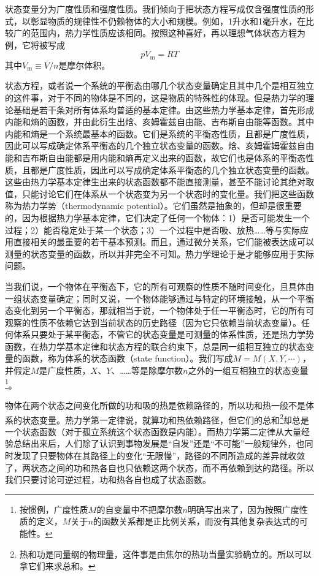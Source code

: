 \documentclass[main.tex]{subfiles}
\begin{document}
状态变量分为广度性质和强度性质。我们倾向于把状态方程写成仅含强度性质的形式，以彰显物质的规律性不仍赖物体的大小和规模。例如，1升水和1毫升水，在比较广的范围内，热力学性质应该相同。按照这种喜好，再以理想气体状态方程为例，它将被写成
\[pV_\text{m}=RT\]
其中$V_\text{m}\equiv V/n$是摩尔体积。

状态方程，或者说一个系统的平衡态由哪几个状态变量确定且其中几个是相互独立的这件事，对于不同的物体是不同的，这是物质的特殊性的体现。但是热力学的理论基础是若干条对所有体系均普适的基本定律。由这些热力学基本定律，首先形成内能和熵的函数，并由此衍生出焓、亥姆霍兹自由能、吉布斯自由能等函数。其中内能和熵是一个系统最基本的函数。它们是系统的平衡态性质，且都是广度性质，因此可以写成确定体系平衡态的几个独立状态变量的函数。焓、亥姆霍姆霍兹自由能和吉布斯自由能都是用内能和熵再定义出来的函数，故它们也是体系的平衡态性质，且都是广度性质，因此可以写成确定体系平衡态的几个独立状态变量的函数。这些由热力学基本定律生出来的状态函数都不能直接测量，甚至不能讨论其绝对取值，只能讨论它们在体系从一个状态变为另一个状态时的变化量。我们把这些函数称为热力学势（thermodynamic potential）。它们虽然是抽象的，但却是很重要的，因为根据热力学基本定律，它们决定了任何一个物体：1）是否可能发生一个过程；2）能否稳定处于某一个状态；3）一个过程中是否吸、放热……等与实际应用直接相关的最重要的若干基本预测。而且，通过微分关系，它们能被表达成可以测量的状态变量的函数，所以并非完全不可知。热力学理论于是才能够应用于实际问题。

当我们说，一个物体在平衡态下，它的所有可观察的性质不随时间变化，且具体由一组状态变量确定；同时又说，一个物体能够通过与特定的环境接触，从一个平衡态变化到另一个平衡态，那就相当于说，一个物体处于任一平衡态时，它的所有可观察的性质不依赖它达到当前状态的历史路径（因为它只依赖当前状态变量）。任何体系只要处于某平衡态，不管它的状态变量是可测量的体系性质，还是热力学势函数，在热力学基本定律和状态方程的联合约束下，总是同一组相互独立的状态变量的函数，称为体系的状态函数（state function）。我们写成$M=M\left(X,Y,\cdots\right)$，并假定$M$是广度性质，$X$、$Y$、……等是除摩尔数$n$之外的一组互相独立的状态变量\footnote{按惯例，广度性质$M$的自变量中不把摩尔数$n$明确写出来了，因为按照广度性质的定义，$M$关于$n$的函数关系都是正比例关系，而没有其他复杂表达式的可能性。}。

物体在两个状态之间变化所做的功和吸的热是依赖路径的，所以功和热一般不是体系的状态变量。热力学第一定律说，就算功和热依赖路径，但它们的总和\footnote{热和功是同量纲的物理量，这件事是由焦尔的热功当量实验确立的。所以可以拿它们来求总和。}却总是一个状态函数（对于孤立系统这个状态函数是内能）。而热力学第二定律从大量经验总结出来后，人们除了认识到事物发展是“自发”还是“不可能”一般规律外，也同时发现了只要物体在其路径上的变化“无限慢”，路径的不同所造成的差异就收敛了，两状态之间的功和热各自也只依赖这两个状态，而不再依赖到达的路径。所以我们只要讨论可逆过程，功和热各自也成了状态函数。
\end{document}
